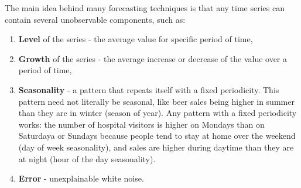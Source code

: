 \documentclass[
]{book}
\providecommand{\tightlist}{%
  \setlength{\itemsep}{0pt}\setlength{\parskip}{0pt}}
\theoremstyle{definition}
\theoremstyle{definition}
\theoremstyle{definition}
\theoremstyle{definition}
\theoremstyle{remark}
\begin{document}
The main idea behind many forecasting techniques is that any time series can contain several unobservable components, such as:

\begin{enumerate}
\def\labelenumi{\arabic{enumi}.}
\tightlist
\item
  \textbf{Level} of the series - the average value for specific period of time,
\item
  \textbf{Growth} of the series - the average increase or decrease of the value over a period of time,
\item
  \textbf{Seasonality} - a pattern that repeats itself with a fixed periodicity. This pattern need not literally be seasonal, like beer sales being higher in summer than they are in winter (season of year). Any pattern with a fixed periodicity works: the number of hospital visitors is higher on Mondays than on Saturdaya or Sundays because people tend to stay at home over the weekend (day of week seasonality), and sales are higher during daytime than they are at night (hour of the day seasonality).
\item
  \textbf{Error} - unexplainable white noise.
\end{enumerate}
\end{document}
